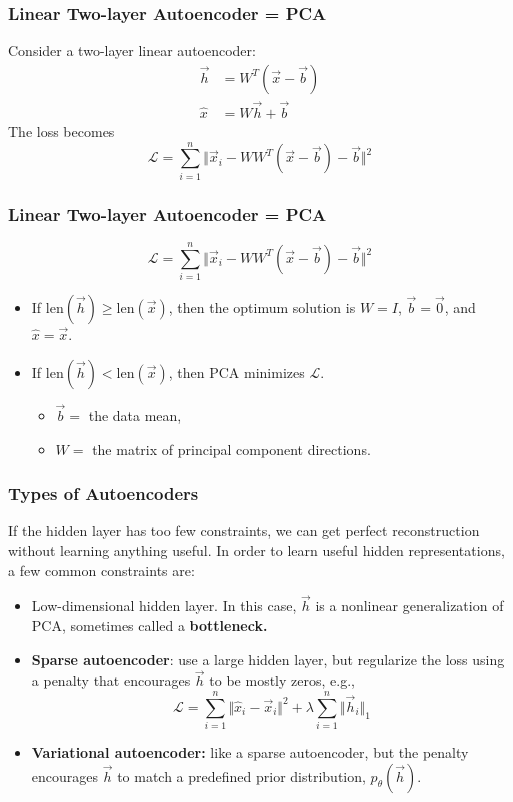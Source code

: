 \documentclass{beamer}
\begin{document}
\begin{frame}
  \frametitle{Linear Two-layer Autoencoder = PCA}

  Consider a two-layer linear autoencoder:
  \begin{align*}
    \vec{h} &= W^T(\vec{x}-\vec{b})\\
    \hat{x} &= W\vec{h}+\vec{b}
  \end{align*}
  The loss becomes
  \begin{displaymath}
    {\mathcal L}=\sum_{i=1}^n \Vert\vec{x}_i-WW^T(\vec{x}-\vec{b})-\vec{b}\Vert^2
  \end{displaymath}
\end{frame}

\begin{frame}
  \frametitle{Linear Two-layer Autoencoder = PCA}
  \begin{displaymath}
    {\mathcal L}=\sum_{i=1}^n \Vert\vec{x}_i-WW^T(\vec{x}-\vec{b})-\vec{b}\Vert^2
  \end{displaymath}
  \begin{itemize}
  \item If $\mbox{len}(\vec{h})\ge\mbox{len}(\vec{x})$, then the
    optimum solution is $W=I$, $\vec{b}=\vec{0}$, and $\hat{x}=\vec{x}$.
  \item If $\mbox{len}(\vec{h})<\mbox{len}(\vec{x})$, then PCA minimizes ${\mathcal L}$.
    \begin{itemize}
    \item $\vec{b}=$ the data mean,
    \item $W=$ the matrix of principal component directions.
    \end{itemize}
  \end{itemize}
\end{frame}

\begin{frame}
  \frametitle{Types of Autoencoders}

  If the hidden layer has too few constraints, we can get perfect
  reconstruction without learning anything useful.  In order to learn
  useful hidden representations, a few common constraints are:
  \begin{itemize}
  \item Low-dimensional hidden layer.  In this case, $\vec{h}$ is a
    nonlinear generalization of PCA, sometimes called a {\bf bottleneck.}
  \item {\bf Sparse autoencoder}: use a large hidden layer, but
    regularize the loss using a penalty that encourages $\vec{h}$ to
    be mostly zeros, e.g.,
    \begin{displaymath}
      {\mathcal L}=\sum_{i=1}^n \Vert\hat{x}_i-\vec{x}_i\Vert^2 + \lambda\sum_{i=1}^n\Vert\vec{h}_i\Vert_1
    \end{displaymath}
  \item {\bf Variational autoencoder:} like a sparse autoencoder, but
    the penalty encourages $\vec{h}$ to match a predefined prior distribution,
    $p_\theta(\vec{h})$.
  \end{itemize}
\end{frame}
\end{document}
